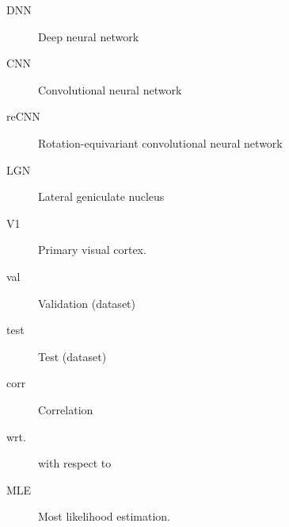 \documentclass[12pt,a4paper]{report}
\begin{document}



\tableofcontents












\listoffigures

\listoftables


\begin{description}
	
	\item[DNN] Deep neural network
	\item[CNN] Convolutional neural network
	\item[reCNN] Rotation-equivariant convolutional neural network
	\item[LGN] Lateral geniculate nucleus
	\item[V1] Primary visual cortex.
	\item[val] Validation (dataset)	
	\item[test] Test (dataset)
	\item[corr] Correlation	
	\item[wrt.] with respect to
	\item[MLE] Most likelihood estimation.

\end{description}

\appendix
\end{document}
